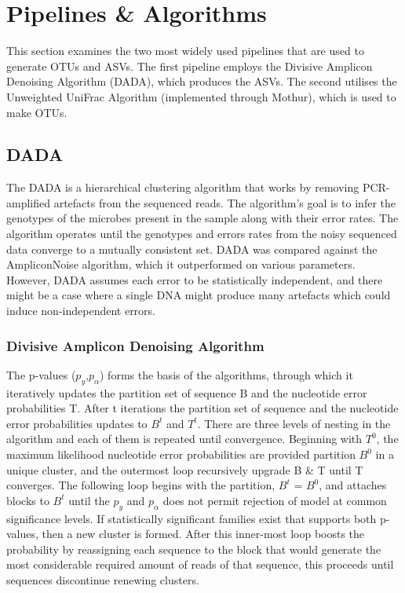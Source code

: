 \chapter{Pipelines \& Algorithms}
 \setcounter{page}{13}

This section examines the two most widely used pipelines that are used to generate OTUs and ASVs. The first pipeline employs the Divisive Amplicon Denoising Algorithm (DADA), which produces the ASVs. The second utilises the Unweighted UniFrac Algorithm (implemented through Mothur), which is used to make OTUs.

\section{DADA}
The DADA is a hierarchical clustering algorithm that works by removing PCR-amplified artefacts from the sequenced reads. The algorithm's goal is to infer the genotypes of the microbes present in the sample along with their error rates. The algorithm operates until the genotypes and errors rates from the noisy sequenced data converge to a mutually consistent set. DADA was compared against the AmpliconNoise algorithm, which it outperformed on various parameters. However, DADA assumes each error to be statistically independent, and there might be a case where a single DNA might produce many artefacts which could induce non-independent errors.\newline

\subsection{Divisive Amplicon Denoising Algorithm}
The p-values ($p_{y}$,$p_{\alpha}$) forms the basis of the algorithms, through which it iteratively updates the partition set of sequence B and the nucleotide error probabilities T. After t iterations the partition set of sequence and the nucleotide error probabilities updates to $B^{t}$ and $T^{t}$. There are three levels of nesting in the algorithm and each of them is repeated until convergence. Beginning with $T^{0}$, the maximum likelihood nucleotide error probabilities are provided partition $B^{0}$ in a unique cluster, and the outermost loop recursively upgrade B \& T until T converges. The following loop begins with the partition, $B^{t}$ = $B^{0}$, and attaches blocks to $B^{t}$ until the $p_{y}$ and $p_{\alpha}$ does not permit rejection of model at common significance levels. If statistically significant families exist that supports both p-values, then a new cluster is formed. After this inner-most loop boosts the probability by reassigning each sequence to the block that would generate the most considerable required amount of reads of that sequence, this proceeds until sequences discontinue renewing clusters.\newline

